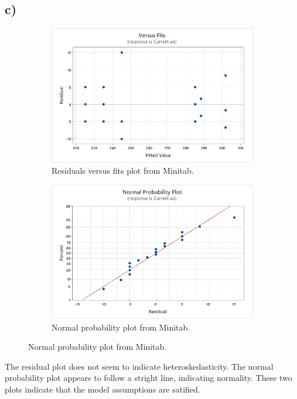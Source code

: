 \documentclass{article}
\begin{document}
\subsection*{c)}
\begin{figure}[h]
    \centering
    \begin{subfigure}[b]{0.45\textwidth}
        \includegraphics[width=1\textwidth]{./images/3_c_1.png}
        \caption{Residuals versus fits plot from Minitab.}
      \label{fig:img11}
    \end{subfigure}
    \hfill
    \begin{subfigure}[b]{0.45\textwidth}
        \includegraphics[width=1\textwidth]{./images/3_c_2.png}
        \caption{Normal probability plot from Minitab.}
      \label{fig:img22}
    \end{subfigure}
    \label{fig:both}
\end{figure}
The residual plot does not seem to indicate heteroskedasticity. The normal probability plot appears to follow a stright line, indicating normality.
These two plots indicate that the model assumptions are satified.
\end{document}
